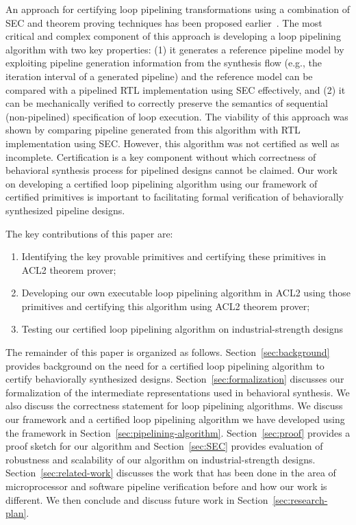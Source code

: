 An approach for certifying loop pipelining transformations using a combination of SEC and 
theorem proving techniques has been proposed earlier~\cite{hrx:dac-12}. The most critical and complex
component of this approach is developing
a loop pipelining algorithm with two key properties: (1) it generates a reference pipeline model 
by exploiting pipeline generation information from the synthesis flow (e.g., the iteration interval 
of a generated pipeline) and the reference model can be compared with a pipelined RTL 
implementation using SEC effectively, and (2) it can be mechanically verified to correctly preserve the semantics of
sequential (non-pipelined) specification of loop execution. The viability of 
this approach was shown by comparing pipeline generated from this algorithm with RTL implementation 
using SEC. However, this algorithm was not certified as well as incomplete. Certification is a key component 
without which correctness of behavioral synthesis process for pipelined designs cannot be claimed.
Our work on developing a certified loop pipelining algorithm using our framework of certified 
primitives is important to facilitating formal verification of behaviorally synthesized
 pipeline designs.

\medskip
The key contributions of this paper are:
\begin{enumerate}
\item Identifying the key provable primitives and certifying these primitives in ACL2 theorem prover; 
\item Developing our own executable loop pipelining algorithm in ACL2 using those primitives and certifying this algorithm using ACL2 theorem prover;
\item Testing our certified loop pipelining algorithm on industrial-strength designs
\end{enumerate}

The remainder of this paper is organized as
follows. Section~\ref{sec:background} provides background on the need for a certified loop pipelining algorithm 
to certify behaviorally synthesized designs. Section~\ref{sec:formalization} 
discusses our formalization of the intermediate representations used in behavioral synthesis.
We also discuss the correctness statement for loop pipelining algorithms. 
We discuss our framework and a certified loop pipelining algorithm we have developed using the framework in Section~\ref{sec:pipelining-algorithm}. Section~\ref{sec:proof} provides a proof sketch for our algorithm and Section~\ref{sec:SEC} provides evaluation of robustness and 
scalability of our algorithm on industrial-strength designs. Section~\ref{sec:related-work} discusses the work that has been done in the area of microprocessor and software pipeline verification before and how our work is different. We then conclude and discuss future work in Section~\ref{sec:research-plan}.



